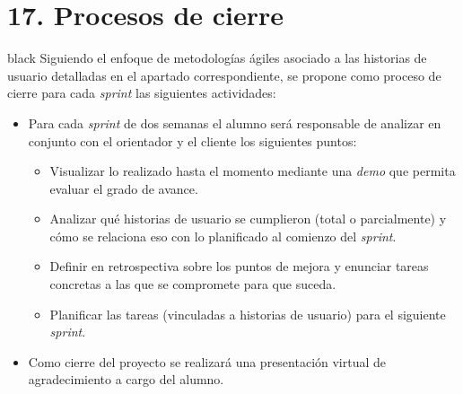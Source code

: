 \documentclass[11pt]{charter}
\begin{document}
\section{17. Procesos de cierre}    
\label{sec:cierre}

\begin{consigna}{black}
Siguiendo el enfoque de metodologías ágiles asociado a las historias de usuario detalladas en el apartado correspondiente, se propone como proceso de cierre para cada \textit{sprint} las siguientes actividades:

\begin{itemize}
\item Para cada \textit{sprint} de dos semanas el alumno será responsable de analizar en conjunto con el orientador y el cliente los siguientes puntos:
\begin{itemize}

\item Visualizar lo realizado hasta el momento mediante una \textit{demo} que permita evaluar el grado de avance. 
\item Analizar qué historias de usuario se cumplieron (total o parcialmente) y cómo se relaciona eso con lo planificado al comienzo del \textit{sprint}.
\item Definir en retrospectiva sobre los puntos de mejora y  enunciar tareas concretas a las que se compromete para 	que suceda.
\item Planificar las tareas (vinculadas a historias de usuario) para el siguiente \textit{sprint}. 
\end{itemize}
\item Como cierre del proyecto se realizará una presentación virtual de agradecimiento a cargo del alumno.

\end{itemize}

\end{consigna}
\end{document}
